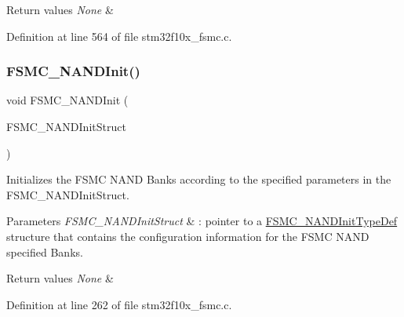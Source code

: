 \begin{DoxyRetVals}{Return values}
{\em None} & \\
\hline
\end{DoxyRetVals}


Definition at line 564 of file stm32f10x\+\_\+fsmc.\+c.

\mbox{\label{group___f_s_m_c___private___functions_ga9f81ccc4e126c11f1eb33077b1a68e6f}} 
\subsubsection{\texorpdfstring{F\+S\+M\+C\+\_\+\+N\+A\+N\+D\+Init()}{FSMC\_NANDInit()}}
{\footnotesize\ttfamily void F\+S\+M\+C\+\_\+\+N\+A\+N\+D\+Init (\begin{DoxyParamCaption}\item[{\hyperlink{struct_f_s_m_c___n_a_n_d_init_type_def}{F\+S\+M\+C\+\_\+\+N\+A\+N\+D\+Init\+Type\+Def} $\ast$}]{F\+S\+M\+C\+\_\+\+N\+A\+N\+D\+Init\+Struct }\end{DoxyParamCaption})}



Initializes the F\+S\+MC N\+A\+ND Banks according to the specified parameters in the F\+S\+M\+C\+\_\+\+N\+A\+N\+D\+Init\+Struct. 


\begin{DoxyParams}{Parameters}
{\em F\+S\+M\+C\+\_\+\+N\+A\+N\+D\+Init\+Struct} & \+: pointer to a \hyperlink{struct_f_s_m_c___n_a_n_d_init_type_def}{F\+S\+M\+C\+\_\+\+N\+A\+N\+D\+Init\+Type\+Def} structure that contains the configuration information for the F\+S\+MC N\+A\+ND specified Banks. \\
\hline
\end{DoxyParams}

\begin{DoxyRetVals}{Return values}
{\em None} & \\
\hline
\end{DoxyRetVals}


Definition at line 262 of file stm32f10x\+\_\+fsmc.\+c.

\mbox{\label{group___f_s_m_c___private___functions_ga8283ad94ad8e83d49d5b77d1c7e17862}} 
